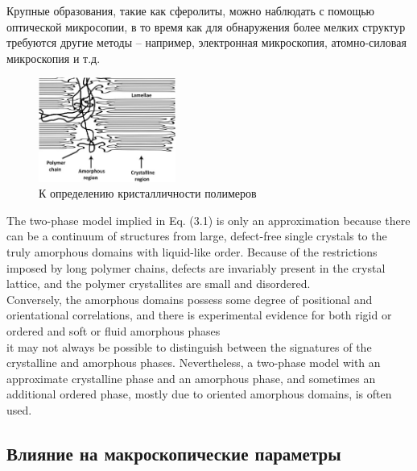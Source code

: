 Крупные образования, такие как сферолиты, можно наблюдать с помощью оптической микросопии, в то время как для обнаружения более мелких структур требуются другие методы -- например, электронная микроскопия, атомно-силовая микроскопия и т.д.

	\begin{figure} 
\vspace{-20pt}
  \begin{center}
    \includegraphics[width=0.4\textwidth]{fig/crystal-2.jpg}
    \caption{К определению кристалличности полимеров}
    \label{fig:crystal-2}
  \end{center}
  \vspace{-20pt}
  \vspace{1pt}
\end{figure}	

The two-phase model implied in Eq. (3.1) is only an approximation because
there can be a continuum of structures from large, defect-free single crystals to
the truly amorphous domains with liquid-like order. Because of the restrictions
imposed by long polymer chains, defects are invariably present in the crystal lattice,
and the polymer crystallites are small and disordered.\\
Conversely, the amorphous
domains possess some degree of positional and orientational correlations, and there
is experimental evidence for both rigid or ordered and soft or fluid amorphous phases\\
it may not always be possible to distinguish between the signatures
of the crystalline and amorphous phases. Nevertheless, a two-phase model with
an approximate crystalline phase and an amorphous phase, and sometimes an additional
ordered phase, mostly due to oriented amorphous domains, is often used.\\



\subsection{Влияние на макроскопические параметры}





	